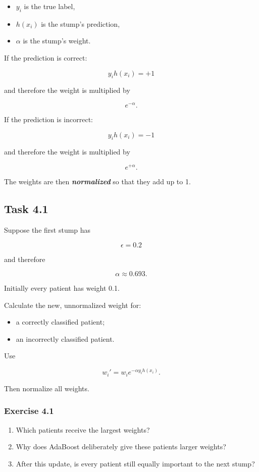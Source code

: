 \documentclass{course_sheet}
\begin{document}
\begin{itemize}
\item
$y_i$ is the true label,

\item
$h(x_i)$ is the stump's prediction,

\item
$\alpha$ is the stump's weight.

\end{itemize}
If the prediction is correct:

\[
y_i h(x_i)=+1
\]

and therefore the weight is multiplied by

\[
e^{-\alpha}.
\]

If the prediction is incorrect:

\[
y_i h(x_i)=-1
\]

and therefore the weight is multiplied by

\[
e^{+\alpha}.
\]

The weights are then \textbf{\textit{normalized}} so that they add up to 1.

\subsection*{Task 4.1}
Suppose the first stump has

\[
\epsilon=0.2
\]

and therefore

\[
\alpha\approx0.693.
\]

Initially every patient has weight 0.1.

Calculate the new, unnormalized weight for:

\begin{itemize}
\item
a correctly classified patient;

\item
an incorrectly classified patient.

\end{itemize}
Use

\[
w_i'=w_i e^{-\alpha y_i h(x_i)}.
\]

Then normalize all weights.

\subsubsection*{Exercise 4.1}
\begin{enumerate}
\item
Which patients receive the largest weights?

\item
Why does AdaBoost deliberately give these patients larger weights?

\item
After this update, is every patient still equally important to the next stump?

\end{enumerate}
\clearpage
\end{document}
